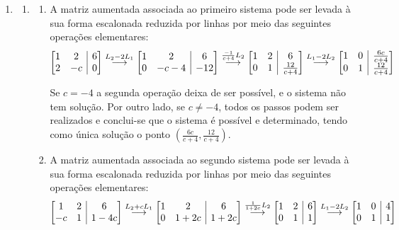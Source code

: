 \documentclass[12pt,a4paper]{article}
\makeatletter
\newenvironment{amatrix}[1]{%
  \left[\begin{array}{@{}*{#1}{c}|c@{}}
}{%
  \end{array}\right]
}
\newcommand{\grstep}[2][\relax]{%
   \ensuremath{\mathrel{
       {\mathop{\longrightarrow}\limits^{#2\mathstrut}_{
                                     \begin{subarray}{l} #1 \end{subarray}}}}}}
\makeatother
\begin{document}
\begin{enumerate}
\item
\begin{enumerate}
\item
\begin{enumerate}
\item A matriz aumentada associada ao primeiro sistema pode ser levada à sua forma escalonada reduzida por linhas por meio das seguintes operações elementares:
\[
\begin{amatrix}{2}
1 & 2 & 6 \\
2 & -c & 0
\end{amatrix}
\grstep{ L_2 - 2 L_1 }
\begin{amatrix}{2}
1 & 2 & 6 \\
0 & -c-4 & -12
\end{amatrix}
\grstep{ \frac{-1}{c+4} L_2 }
\begin{amatrix}{2}
1 & 2 & 6 \\
0 & 1 & \frac{12}{c+4}
\end{amatrix}
\grstep{ L_1 - 2 L_2 }
\begin{amatrix}{2}
1 & 0 & \frac{6c}{c+4} \\
0 & 1 & \frac{12}{c+4}
\end{amatrix}
\]

Se $c = -4$ a segunda operação deixa de ser possível, e o sistema não tem solução. Por outro lado, se $c \neq -4$, todos os passos podem ser realizados e conclui-se que o sistema é possível e determinado, tendo como única solução o ponto $\left(\frac{6c}{c+4}, \frac{12}{c+4}\right)$.
\item A matriz aumentada associada ao segundo sistema pode ser levada à sua forma escalonada reduzida por linhas por meio das seguintes operações elementares:
\begin{align*}
\begin{amatrix}{2}
1 & 2 & 6 \\
-c & 1 & 1-4c
\end{amatrix}
\grstep{ L_2 + c L_1 }
\begin{amatrix}{2}
1 & 2 & 6 \\
0 & 1+2c & 1+2c
\end{amatrix}
&
\grstep{ \frac{1}{1+2c} L_2 }
\begin{amatrix}{2}
1 & 2 & 6 \\
0 & 1 & 1
\end{amatrix}
\grstep{ L_1 - 2 L_2 }
\begin{amatrix}{2}
1 & 0 & 4 \\
0 & 1 & 1
\end{amatrix}
\end{align*}


\end{enumerate}
\end{enumerate}
\end{enumerate}
\end{document}
